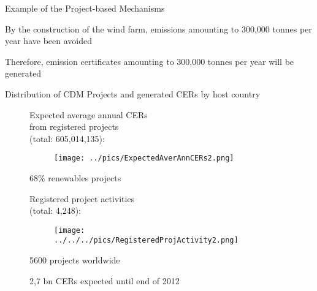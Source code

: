 
{Example of the Project-based Mechanisms}
\item<1-> By the construction of the wind farm, emissions amounting to 300,000 tonnes per year have been avoided
\item<2-> Therefore, emission certificates amounting to 300,000 tonnes per year will be generated


{Distribution of CDM Projects and generated CERs by host country }
\begin{figure}[t]
\begin{minipage}[t]{0.475\textwidth}
Expected average annual CERs \\
from registered projects \\
(total: 605,014,135):
\vspace*{-0.7cm}
\begin{figure}
\centering
\texttt{[image: ../pics/ExpectedAverAnnCERs2.png]}
\end{figure}
\vspace*{-0.8cm}
\item<1-> 68\% renewables projects %
\vspace*{-0.9cm}

\end{minipage}
\begin{minipage}[t]{0.475\textwidth}
Registered project activities\\
(total: 4,248):
\vspace*{-0.7cm}
\begin{figure}
\centering
\texttt{[image: ../../../pics/RegisteredProjActivity2.png]}
\end{figure}
\vspace*{-0.8cm}
\item<1-> 5600  projects worldwide
\item<2-> 2,7 bn CERs expected until end of 2012
\end{minipage}
\end{figure}

